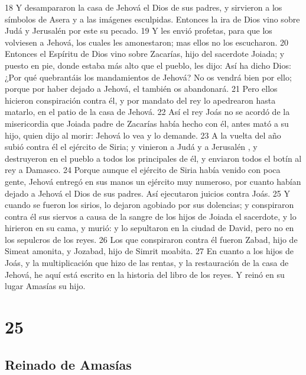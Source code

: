 18 Y desampararon la casa de Jehová el Dios de sus padres, y sirvieron a los símbolos de Asera y a las imágenes esculpidas. Entonces la ira de Dios vino sobre Judá y Jerusalén  por este su pecado.
19 Y les envió profetas, para que los volviesen a Jehová, los cuales les amonestaron; mas ellos no los escucharon.
20 Entonces el Espíritu de Dios vino sobre Zacarías, hijo del sacerdote Joiada; y puesto en pie, donde estaba más alto que el pueblo, les dijo: Así ha dicho Dios: ¿Por qué quebrantáis los mandamientos de Jehová?  No os vendrá bien por ello; porque por haber dejado a Jehová, el también os abandonará.
21 Pero ellos hicieron conspiración contra él, y por mandato del rey lo apedrearon hasta matarlo, en el patio de la casa de Jehová. 
22 Así el rey Joás no se acordó de la misericordia que Joiada padre de Zacarías había hecho con él, antes mató a su hijo, quien dijo al morir: Jehová lo vea y lo demande.
23 A la vuelta del año subió contra él el ejército de Siria; y vinieron a Judá y a Jerusalén , y destruyeron en el pueblo a todos los principales de él, y enviaron todos el botín al rey a Damasco.
24 Porque aunque el ejército de Siria había venido con poca gente, Jehová entregó en sus manos un ejército muy numeroso, por cuanto habían dejado a Jehová el Dios de sus padres. Así ejecutaron juicios contra Joás.
25 Y cuando se fueron los sirios, lo dejaron agobiado por sus dolencias; y conspiraron contra él sus siervos a causa de la sangre de los hijos de Joiada el sacerdote, y lo hirieron en su cama, y murió: y lo sepultaron en la ciudad de David, pero no en los sepulcros de los reyes.
26 Los que conspiraron contra él fueron Zabad, hijo de Simeat amonita, y Jozabad, hijo de Simrit moabita.
27 En cuanto a los hijos de Joás, y la multiplicación que hizo de las rentas, y la restauración de la casa de Jehová, he aquí está escrito en la historia del libro de los reyes. Y reinó en su lugar Amasías su hijo.

\chapter{25}

\section*{Reinado de Amasías}

